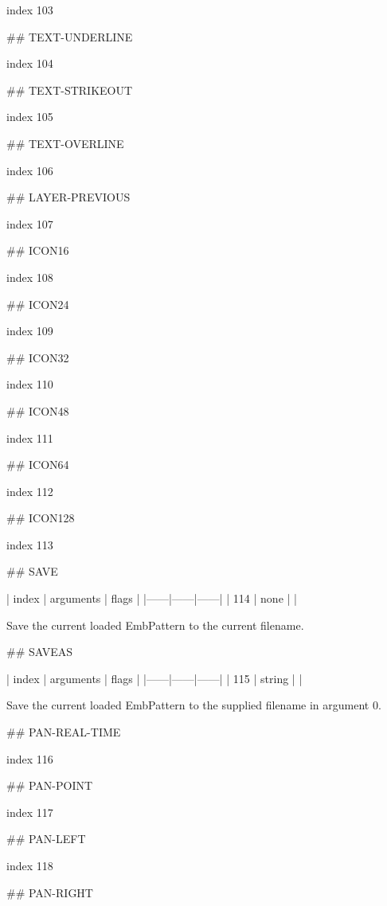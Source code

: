 index 103



## TEXT-UNDERLINE

index 104



## TEXT-STRIKEOUT

index 105



## TEXT-OVERLINE

index 106



## LAYER-PREVIOUS

index 107



## ICON16

index 108



## ICON24

index 109



## ICON32

index 110



## ICON48

index 111



## ICON64

index 112



## ICON128

index 113



## SAVE

| index | arguments | flags |
|------|------|------|
| 114 | none | |

Save the current loaded EmbPattern to the current filename.

## SAVEAS

| index | arguments | flags |
|------|------|------|
| 115 | string | |

Save the current loaded EmbPattern to the supplied filename in argument 0.

## PAN-REAL-TIME

index 116



## PAN-POINT

index 117



## PAN-LEFT

index 118



## PAN-RIGHT

